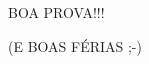 \documentclass[12pt,a4paper]{article}
\begin{document}
\begin{center}
BOA PROVA!!!
\end{center}
\begin{center}
(E BOAS FÉRIAS ;-)
\end{center}

\end{document}
